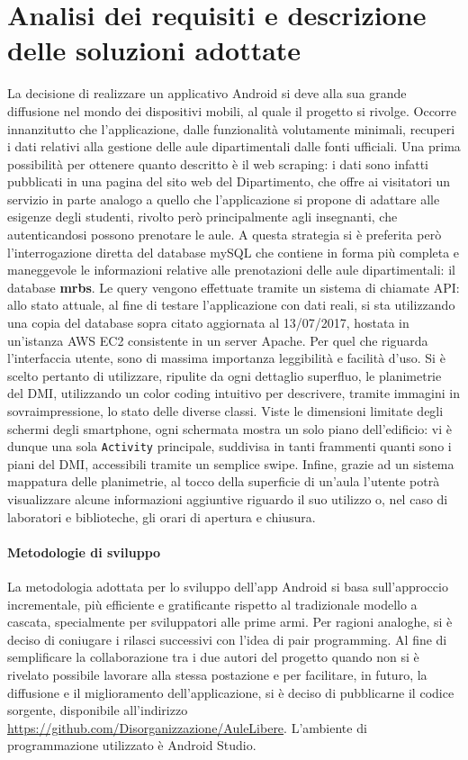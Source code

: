 \documentclass{article}
\def\code#1{\texttt{#1}}
\begin{document}
	\section{Analisi dei requisiti e descrizione delle soluzioni adottate} 
	La decisione di realizzare un applicativo Android si deve alla sua grande diffusione nel mondo dei dispositivi mobili, al quale il progetto si rivolge.
	Occorre innanzitutto che l'applicazione, dalle funzionalità volutamente minimali, recuperi i dati relativi alla gestione delle aule dipartimentali dalle fonti ufficiali. Una prima possibilità per ottenere quanto descritto è il web scraping: i dati sono infatti pubblicati in una pagina del sito web del Dipartimento, che offre ai visitatori un servizio in parte analogo a quello che l'applicazione si propone di adattare alle esigenze degli studenti, rivolto però principalmente agli insegnanti, che autenticandosi possono prenotare le aule. A questa strategia si è preferita però l'interrogazione diretta del database mySQL che contiene in forma più completa e maneggevole le informazioni relative alle prenotazioni delle aule dipartimentali: il database \textbf{mrbs}. Le query vengono effettuate tramite un sistema di chiamate API: allo stato attuale, al fine di testare l'applicazione con dati reali, si sta utilizzando una copia del database sopra citato aggiornata al 13/07/2017, hostata in un'istanza AWS EC2 consistente in un server Apache.
	Per quel che riguarda l'interfaccia utente, sono di massima importanza leggibilità e facilità d'uso. Si è scelto pertanto di utilizzare, ripulite da ogni dettaglio superfluo, le planimetrie del DMI, utilizzando un color coding intuitivo per descrivere, tramite immagini in sovraimpressione, lo stato delle diverse classi. Viste le dimensioni limitate degli schermi degli smartphone, ogni schermata mostra un solo piano dell'edificio: vi è dunque una sola \code{Activity} principale, suddivisa in tanti frammenti quanti sono i piani del DMI, accessibili tramite un semplice swipe. Infine, grazie ad un sistema mappatura delle planimetrie, al tocco della superficie di un'aula l'utente potrà visualizzare alcune informazioni aggiuntive riguardo il suo utilizzo o, nel caso di laboratori e biblioteche, gli orari di apertura e chiusura.
	\paragraph{Metodologie di sviluppo}
	La metodologia adottata per lo sviluppo dell'app Android si basa sull'approccio incrementale, più efficiente e gratificante rispetto al tradizionale modello a cascata, specialmente per sviluppatori alle prime armi. Per ragioni analoghe, si è deciso di coniugare i rilasci successivi con l'idea di pair programming.
	Al fine di semplificare la collaborazione tra i due autori del progetto quando non si è rivelato possibile lavorare alla stessa postazione e per facilitare, in futuro, la diffusione e il miglioramento dell'applicazione, si è deciso di pubblicarne il codice sorgente, disponibile all'indirizzo \url{https://github.com/Disorganizzazione/AuleLibere}.
	L'ambiente di programmazione utilizzato è Android Studio.
\end{document}
